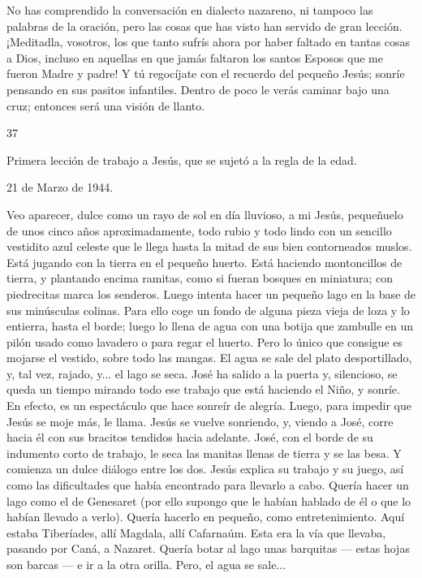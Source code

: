 \documentclass[12pt]{book} %
\begin{document}
No has comprendido la conversación en dialecto nazareno, ni tampoco las palabras de la oración, pero las cosas que has 
visto han servido de gran lección. ¡Meditadla, vosotros, los que tanto sufrís ahora por haber faltado en tantas cosas a Dios, incluso en aquellas en que jamás faltaron los santos Esposos que me fueron Madre y padre! 
Y tú regocíjate con el recuerdo del pequeño Jesús; sonríe pensando en sus pasitos infantiles. Dentro de poco le verás 
caminar bajo una cruz; entonces será una visión de llanto. 
 
37 
 
Primera lección de trabajo a Jesús, que se sujetó a la regla de la edad. 
 
21 de Marzo de 1944. 
 
Veo aparecer, dulce como un rayo de sol en día lluvioso, a mi Jesús, pequeñuelo de unos cinco años aproximadamente, 
todo rubio y todo lindo con un sencillo vestidito azul celeste que le llega hasta la mitad de sus bien contorneados muslos. 
Está jugando con la tierra en el pequeño huerto. Está haciendo montoncillos de tierra, y plantando encima ramitas, como si fueran bosques en miniatura; con piedrecitas marca los senderos. Luego intenta hacer un pequeño lago en la base de sus minúsculas colinas. Para ello coge un fondo de alguna pieza vieja de loza y lo entierra, hasta el borde; luego lo llena de agua con una botija que zambulle en un pilón usado como lavadero o para regar el huerto. Pero lo único que consigue es mojarse el vestido, sobre todo las mangas. El agua se sale del plato desportillado, y, tal vez, rajado, y... el lago se seca. 
José ha salido a la puerta y, silencioso, se queda un tiempo mirando todo ese trabajo que está haciendo el Niño, y 
sonríe. En efecto, es un espectáculo que hace sonreír de alegría. Luego, para impedir que 
Jesús se moje más, le llama. Jesús se vuelve sonriendo, y, viendo a José, corre hacia él con sus bracitos tendidos hacia adelante. José, con el borde de su indumento corto de trabajo, le seca las manitas llenas de tierra y se las besa. Y comienza un dulce diálogo entre los dos. 
Jesús explica su trabajo y su juego, así como las dificultades que había encontrado para llevarlo a cabo. Quería hacer un lago como el de Genesaret (por ello supongo que le habían hablado de él o que lo habían llevado a verlo). Quería hacerlo en pequeño, como entretenimiento. Aquí estaba Tiberíades, allí Magdala, allí Cafarnaúm. Esta era la vía que llevaba, pasando por Caná, a Nazaret. Quería botar al lago unas barquitas — estas hojas son barcas — e ir a la otra orilla. Pero, el agua se sale... 
\end{document}
